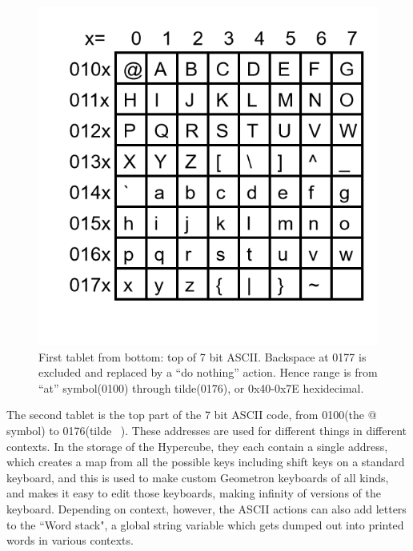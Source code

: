 \documentclass[11pt]{article}
\begin{document}
\begin{figure}
\includegraphics[width=\linewidth]{figures/figure4_asciitablet.png}
\caption{First tablet from bottom: top of 7 bit ASCII.  Backspace at 0177 is excluded and replaced by a ``do nothing'' action.  Hence range is from ``at'' symbol(0100) through tilde(0176), or 0x40-0x7E hexidecimal.}
\end{figure}

    The second tablet is the top part of the 7 bit ASCII code, from 0100(the @ symbol) to 0176(tilde ~).  These addresses are used for different things in different contexts. In the storage of the Hypercube, they each contain a single address, which creates a map from all the possible keys including shift keys on a standard keyboard, and this is used to make custom Geometron keyboards of all kinds, and makes it easy to edit those keyboards, making infinity of versions of the keyboard.  Depending on context, however, the ASCII actions can also add letters to the ``Word stack", a global string variable which gets dumped out into printed words in various contexts.
\end{document}
